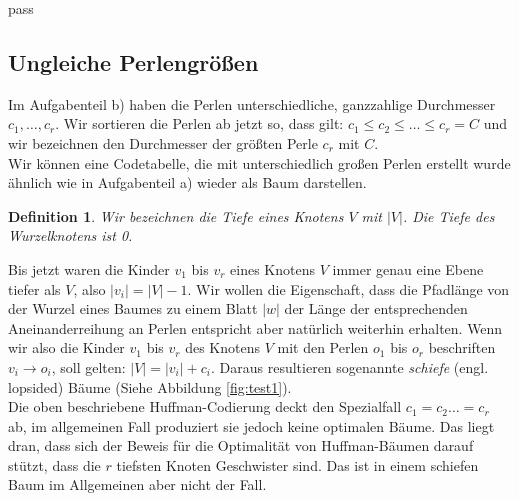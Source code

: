 pass\documentclass[a4paper,10pt,ngerman]{scrartcl}
\newtheorem{definition}[satz]{Definition}
\begin{document}
    \subsection{Ungleiche Perlengrößen}
    Im Aufgabenteil b) haben die Perlen unterschiedliche, ganzzahlige Durchmesser $c_1, \dots, c_r$. Wir sortieren die Perlen ab jetzt so, dass gilt: $c_1 \le c_2 \le \dots \le c_r = C$ und wir bezeichnen den Durchmesser der größten Perle $c_r$ mit $C$. \\
    Wir können eine Codetabelle, die mit unterschiedlich großen Perlen erstellt wurde ähnlich wie in Aufgabenteil a) wieder als Baum darstellen.
    \begin{definition}
        Wir bezeichnen die Tiefe eines Knotens $V$ mit $|V|$. Die Tiefe des Wurzelknotens ist 0.
    \end{definition}
    Bis jetzt waren die Kinder $v_1$ bis $v_r$ eines Knotens $V$ immer genau eine Ebene tiefer als $V$, also $|v_i| = |V| - 1$.
    Wir wollen die Eigenschaft, dass die Pfadlänge von der Wurzel eines Baumes zu einem Blatt $|w|$ der Länge der entsprechenden Aneinanderreihung an Perlen entspricht aber natürlich weiterhin erhalten. Wenn wir also die Kinder $v_1$ bis $v_r$ des Knotens $V$ mit den Perlen $o_1$ bis $o_{r}$ beschriften $v_i \to o_i$, soll gelten: $|V| = |v_i| + c_i$.
    Daraus resultieren sogenannte \textit{schiefe} (engl. lopsided) Bäume (Siehe Abbildung \ref{fig:test1}). \\
    Die oben beschriebene Huffman-Codierung deckt den Spezialfall $c_1 = c_2 \dots = c_r$ ab, im allgemeinen Fall produziert sie jedoch keine optimalen Bäume.
    Das liegt dran, dass sich der Beweis für die Optimalität von Huffman-Bäumen darauf stützt, dass die $r$ tiefsten Knoten Geschwister sind.
    Das ist in einem schiefen Baum im Allgemeinen aber nicht der Fall.
\end{document}
